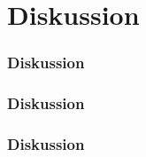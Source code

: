 \section{Diskussion}
\begin{frame}
\frametitle{Diskussion}

\end{frame}

\begin{frame}
\frametitle{Diskussion}

\end{frame}

\begin{frame}
\frametitle{Diskussion}

\end{frame}